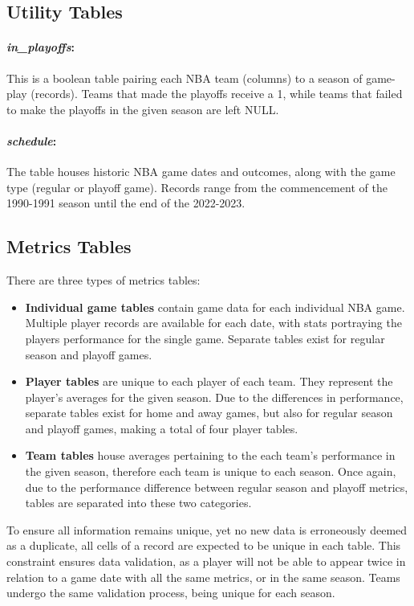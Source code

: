 \documentclass{thesis-ekf}
\theoremstyle{definition}
\theoremstyle{remark}
\begin{document}
{\subsection{Utility Tables} 
\paragraph{\emph{in\_playoffs}:} This is a boolean table pairing each NBA team (columns) to a season of game-play (records). Teams that made the playoffs receive a 1, while teams that failed to make the playoffs in the given season are left NULL.

\paragraph{\emph{schedule}:} The table houses historic NBA game dates and outcomes, along with the game type (regular or playoff game). Records range from the commencement of the 1990-1991 season until the end of the 2022-2023.

\subsection{Metrics Tables}
There are three types of metrics tables:
\begin{itemize}
	\item \textbf{Individual game tables} contain game data for each individual NBA game. Multiple player records are available for each date, with stats portraying the players performance for the single game. Separate tables exist for regular season and playoff games.
	
	\item \textbf{Player tables} are unique to each player of each team. They represent the player's averages for the given season. Due to the differences in performance, separate tables exist for home and away games, but also for regular season and playoff games, making a total of four player tables.
	
	\item \textbf{Team tables} house averages pertaining to the each team's performance in the given season, therefore each team is unique to each season. Once again, due to the performance difference between regular season and playoff metrics, tables are separated into these two categories.
\end{itemize}
To ensure all information remains unique, yet no new data is erroneously deemed as a duplicate, all cells of a record are expected to be unique in each table. This constraint ensures data validation, as a player will not be able to appear twice in relation to a game date with all the same metrics, or in the same season. Teams undergo the same validation process, being unique for each season.

}
\end{document}

